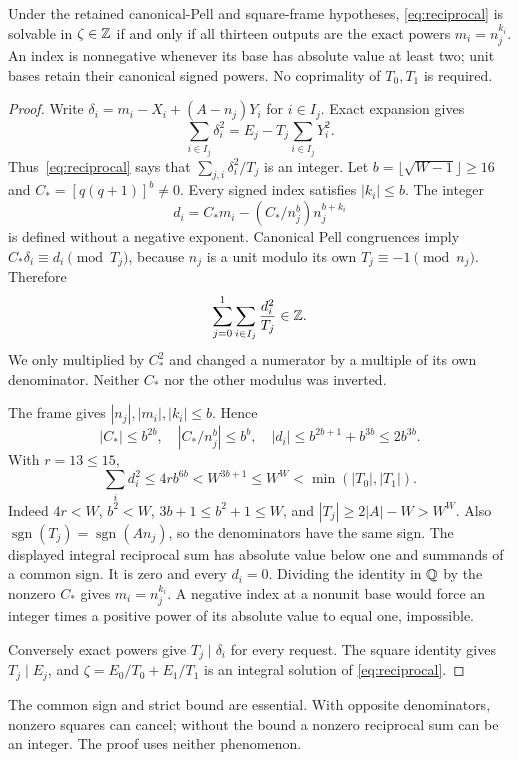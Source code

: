 \begin{theorem}
Under the retained canonical-Pell and square-frame hypotheses,
\eqref{eq:reciprocal} is solvable in $\zeta\in\mathbb Z$ if and only if all
thirteen outputs are the exact powers $m_i=n_j^{k_i}$. An index is
nonnegative whenever its base has absolute value at least two; unit bases
retain their canonical signed powers. No coprimality of $T_0,T_1$ is required.
\end{theorem}
\begin{proof}
Write $\delta_i=m_i-X_i+(A-n_j)Y_i$ for $i\in I_j$.
Exact expansion gives
\[
 \sum_{i\in I_j}\delta_i^2=E_j-T_j\sum_{i\in I_j}Y_i^2.
\]
Thus~\eqref{eq:reciprocal} says that $\sum_{j,i}\delta_i^2/T_j$ is an
integer. Let $b=\lfloor\sqrt{W-1}\rfloor\ge16$ and
$C_*=[q(q+1)]^b\ne0$. Every signed index satisfies $|k_i|\le b$.
The integer
\[
 d_i=C_*m_i-(C_*/n_j^b)n_j^{b+k_i}
\]
is defined without a negative exponent. Canonical Pell congruences imply
$C_*\delta_i\equiv d_i\pmod{T_j}$, because $n_j$ is a unit modulo its
own $T_j\equiv-1\pmod{n_j}$. Therefore
\[
 \sum_{j=0}^1\sum_{i\in I_j}\frac{d_i^2}{T_j}\in\mathbb Z.
\]
We only multiplied by $C_*^2$ and changed a numerator by a multiple of its
own denominator. Neither $C_*$ nor the other modulus was inverted.

The frame gives $|n_j|,|m_i|,|k_i|\le b$. Hence
\[
 |C_*|\le b^{2b},\quad |C_*/n_j^b|\le b^b,\quad
 |d_i|\le b^{2b+1}+b^{3b}\le2b^{3b}.
\]
With $r=13\le15$,
\[
 \sum_i d_i^2\le4rb^{6b}<W^{3b+1}\le W^W
       <\min(|T_0|,|T_1|).
\]
Indeed $4r<W$, $b^2<W$, $3b+1\le b^2+1\le W$, and
$|T_j|\ge2|A|-W>W^W$. Also $\operatorname{sgn}(T_j)=
\operatorname{sgn}(An_j)$, so the denominators have the same sign.
The displayed integral reciprocal sum has absolute value below one and
summands of a common sign. It is zero and every $d_i=0$. Dividing the
identity in $\mathbb Q$ by the nonzero $C_*$ gives $m_i=n_j^{k_i}$.
A negative index at a nonunit base would force an integer times a
positive power of its absolute value to equal one, impossible.

Conversely exact powers give $T_j\mid\delta_i$ for every request.
The square identity gives $T_j\mid E_j$, and
$\zeta=E_0/T_0+E_1/T_1$ is an integral solution of
\eqref{eq:reciprocal}.
\end{proof}
The common sign and strict bound are essential. With opposite denominators,
nonzero squares can cancel; without the bound a nonzero reciprocal sum can
be an integer. The proof uses neither phenomenon.

